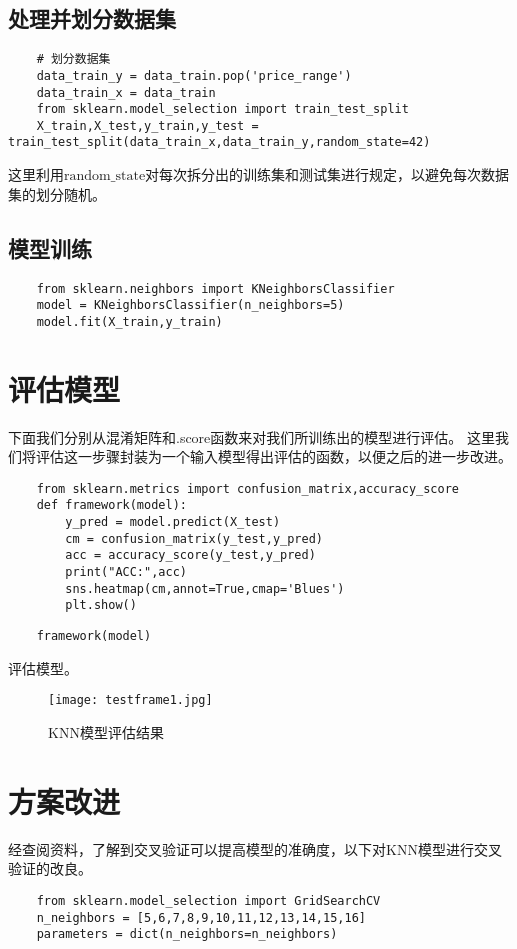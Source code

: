 \documentclass[AutoFakeBold]{LZUThesis}
\begin{document}
\section{处理并划分数据集}
\begin{lstlisting}
    # 划分数据集
    data_train_y = data_train.pop('price_range')
    data_train_x = data_train
    from sklearn.model_selection import train_test_split
    X_train,X_test,y_train,y_test = train_test_split(data_train_x,data_train_y,random_state=42)
\end{lstlisting}
这里利用$\mathrm{random\_state}$对每次拆分出的训练集和测试集进行规定，以避免每次数据集的划分随机。
\section{模型训练}
\begin{lstlisting}
    from sklearn.neighbors import KNeighborsClassifier
    model = KNeighborsClassifier(n_neighbors=5)
    model.fit(X_train,y_train)
\end{lstlisting}
\chapter{评估模型}
下面我们分别从混淆矩阵和.score函数来对我们所训练出的模型进行评估。
这里我们将评估这一步骤封装为一个输入模型得出评估的函数，以便之后的进一步改进。
\begin{lstlisting}
    from sklearn.metrics import confusion_matrix,accuracy_score
    def framework(model):
        y_pred = model.predict(X_test)
        cm = confusion_matrix(y_test,y_pred)
        acc = accuracy_score(y_test,y_pred)
        print("ACC:",acc)
        sns.heatmap(cm,annot=True,cmap='Blues')
        plt.show()
\end{lstlisting}
\begin{lstlisting}
    framework(model)
\end{lstlisting}
评估模型。
\begin{figure}[htbp]
    \centering
    \texttt{[image: testframe1.jpg]}
    \caption{KNN模型评估结果}
\end{figure}

\chapter{方案改进}
经查阅资料，了解到交叉验证可以提高模型的准确度，以下对KNN模型进行交叉验证的改良。
\begin{lstlisting}
    from sklearn.model_selection import GridSearchCV
    n_neighbors = [5,6,7,8,9,10,11,12,13,14,15,16]
    parameters = dict(n_neighbors=n_neighbors)    
\end{lstlisting}
\end{document}
